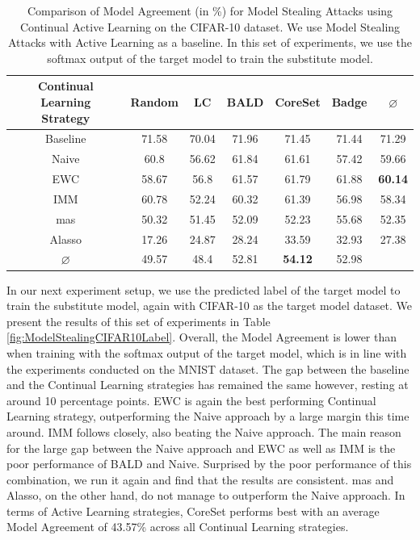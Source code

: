 \begin{table}[h]
    \centering
    \begin{tabular}{c | c c c c c | c} 
        \hline
        \diagbox[width=11em]{Active \\ Learning Strategy}{Continual Learning \\ Strategy} & Random & LC & BALD & CoreSet & Badge & $\varnothing$\\ 
        \hline 
        Baseline & 71.58 & 70.04 & 71.96 & 71.45 & 71.44 & 71.29\\
        \hline
        Naive & 60.8 & 56.62 & 61.84 & 61.61 & 57.42 & 59.66 \\
        EWC & 58.67 & 56.8 & 61.57 & 61.79 & 61.88 & \textbf{60.14}\\
        IMM & 60.78 & 52.24 & 60.32 & 61.39 & 56.98 & 58.34 \\
        \gls{mas} & 50.32 & 51.45 & 52.09 & 52.23 & 55.68 & 52.35\\
        Alasso & 17.26 & 24.87 & 28.24 & 33.59 & 32.93 & 27.38\\
        \hline
        $\varnothing$ & 49.57 & 48.4 & 52.81 & \textbf{54.12} & 52.98\\
        \hline
    \end{tabular}
    \caption{Comparison of Model Agreement (in \%) for Model Stealing Attacks using Continual Active Learning on the CIFAR-10 dataset. We use Model Stealing Attacks with Active Learning as a baseline. In this set of experiments,
    we use the softmax output of the target model to train the substitute model.}
    \label{fig:ModelStealingCIFAR10Softmax}
\end{table}

In our next experiment setup, we use the predicted label of the target model to train the substitute model, again with CIFAR-10 as the target model dataset. We present the results of this set of experiments in Table \ref{fig:ModelStealingCIFAR10Label}. Overall,
the Model Agreement is lower than when training with the softmax output of the target model, which is in line with the experiments conducted on the MNIST dataset. The gap between the baseline and the Continual Learning strategies has remained the same however,
resting at around 10 percentage points. EWC is again the best performing Continual Learning strategy, outperforming the Naive approach by a large margin this time around. IMM follows closely, also beating the Naive approach. The main reason for the large gap
between the Naive approach and EWC as well as IMM is the poor performance of BALD and Naive. Surprised by the poor performance of this combination, we run it again and find that the results are consistent. \gls{mas} and Alasso, on the other hand, do not manage to
outperform the Naive approach. In terms of Active Learning strategies, CoreSet performs best with an average Model Agreement of 43.57\% across all Continual Learning strategies. \par

